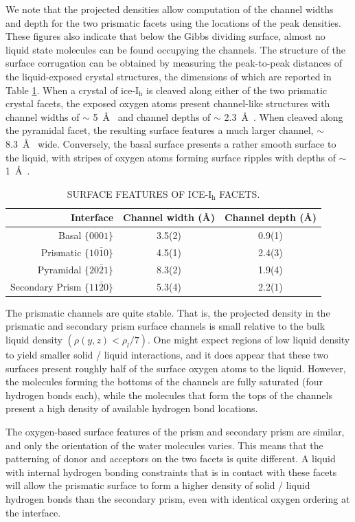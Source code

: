 We note that the projected densities allow computation of the channel
widths and depth for the two prismatic facets using the locations of
the peak densities.  These figures also indicate that below the Gibbs
dividing surface, almost no liquid state molecules can be found
occupying the channels.  The structure of the surface corrugation can
be obtained by measuring the peak-to-peak distances of the
liquid-exposed crystal structures, the dimensions of which are
reported in Table \ref{tab:surf}. When a crystal of ice-I$_\mathrm{h}$
is cleaved along either of the two prismatic crystal facets, the
exposed oxygen atoms present channel-like structures with channel
widths of $\sim$ 5~\AA~ and channel depths of $\sim$ 2.3~\AA~.  When
cleaved along the pyramidal facet, the resulting surface features a
much larger channel, $\sim$ 8.3~\AA~ wide.  Conversely, the basal
surface presents a rather smooth surface to the liquid, with stripes
of oxygen atoms forming surface ripples with depths of $\sim$ 1~\AA~.

\begin{table}[h]
\centering
\caption{SURFACE FEATURES OF ICE-I$_\mathrm{h}$ FACETS.\label{tab:surf}}
\begin{tabular}{|r|cc|}  
\toprule
Interface & Channel width (\AA) & Channel depth (\AA) \\ 
\midrule
Basal  $\{0001\}$                 & 3.5(2) & 0.9(1)  \\
Prismatic  $\{10\bar{1}0\}$       & 4.5(1) & 2.4(3)  \\
Pyramidal  $\{20\bar{2}1\}$       & 8.3(2) & 1.9(4)  \\
Secondary Prism  $\{11\bar{2}0\}$ & 5.3(4) & 2.2(1)  \\ 
\bottomrule
\end{tabular}
\end{table}

The prismatic channels are quite stable. That is, the projected
density in the prismatic and secondary prism surface channels is small
relative to the bulk liquid density $(\rho(y,z) < \rho_l / 7)$.  One
might expect regions of low liquid density to yield smaller solid /
liquid interactions, and it does appear that these two surfaces
present roughly half of the surface oxygen atoms to the liquid.
However, the molecules forming the bottoms of the channels are fully
saturated (four hydrogen bonds each), while the molecules that form
the tops of the channels present a high density of available hydrogen
bond locations.

The oxygen-based surface features of the prism and secondary prism are
similar, and only the orientation of the water molecules varies.  This
means that the patterning of donor and acceptors on the two facets is
quite different. A liquid with internal hydrogen bonding constraints
that is in contact with these facets will allow the prismatic surface
to form a higher density of solid / liquid hydrogen bonds than the
secondary prism, even with identical oxygen ordering at the interface.

